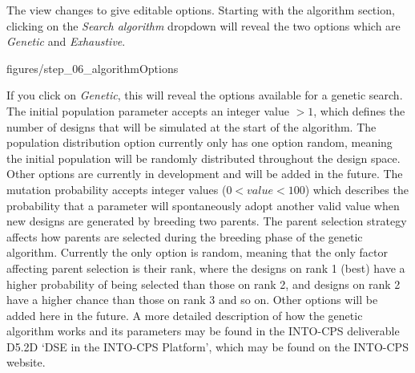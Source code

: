 \documentclass[11pt,a4paper]{../tutorial}
\begin{document}
The view changes to give editable options. Starting with the algorithm section, clicking on the \emph{Search algorithm} dropdown will reveal the two options which are \emph{Genetic} and \emph{Exhaustive}.



\begin{center}\begin{annotation}[width=0.7\linewidth,trim=0 0 0 0,clip]{figures/step_06_algorithmOptions}
    \end{annotation}\end{center}

\newpage

If you click on \emph{Genetic}, this will reveal the options available for a genetic search.  The initial population parameter accepts an integer value $>1$, which defines the number of designs that will be simulated at the start of the algorithm.  The population distribution option currently only has one option random, meaning the initial population will be randomly distributed throughout the design space. Other options are currently in development and will be added in the future. The mutation probability accepts integer values ($0 < value < 100$) which describes the probability that a parameter will spontaneously adopt another valid value when new designs are generated by breeding two parents.  The parent selection strategy affects how parents are selected during the breeding phase of the genetic algorithm.  Currently the only option is random, meaning that the only factor affecting parent selection is their rank, where the designs on rank 1 (best) have a higher probability of being selected than those on rank 2, and designs on rank 2 have a higher chance than those on rank 3 and so on. Other options will be added here in the future.  A more detailed description of how the genetic algorithm works and its parameters may be found in the INTO-CPS deliverable D5.2D `DSE in the INTO-CPS Platform’, which may be found on the INTO-CPS website.
\end{document}
